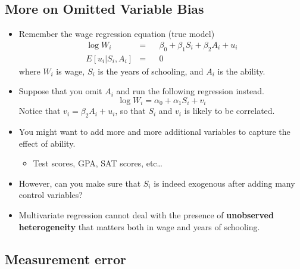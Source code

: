 \documentclass[]{book}
\providecommand{\tightlist}{%
  \setlength{\itemsep}{0pt}\setlength{\parskip}{0pt}}
\begin{document}
\subsection{More on Omitted Variable
Bias}\label{more-on-omitted-variable-bias}

\begin{itemize}
\tightlist
\item
  Remember the wage regression equation (true model) \[
  \begin{aligned}
  \log W_{i}  &=&  & \beta_{0}+\beta_{1}S_{i}+\beta_{2}A_{i}+u_{i} \\
  E[u_{i}|S_{i},A_{i}]    &=& & 0
  \end{aligned}
  \] where \(W_{i}\) is wage, \(S_{i}\) is the years of schooling, and
  \(A_{i}\) is the ability.
\item
  Suppose that you omit \(A_i\) and run the following regression
  instead. \[
  \log W_{i}  =   \alpha_{0}+\alpha_{1} S_{i} + v_i 
  \] Notice that \(v_i = \beta_2 A_i + u_i\), so that \(S_i\) and
  \(v_i\) is likely to be correlated.
\item
  You might want to add more and more additional variables to capture
  the effect of ability.

  \begin{itemize}
  \tightlist
  \item
    Test scores, GPA, SAT scores, etc\ldots{}
  \end{itemize}
\item
  However, can you make sure that \(S_i\) is indeed exogenous after
  adding many control variables?
\item
  Multivariate regression cannot deal with the presence of
  \textbf{unobserved heterogeneity} that matters both in wage and years
  of schooling.
\end{itemize}

\subsection{Measurement error}\label{measurement-error}
\end{document}
